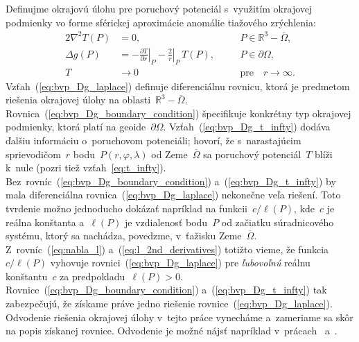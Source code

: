 \documentclass[a4paper,12pt]{book}
\begin{document}
Definujme okrajovú úlohu pre poruchový potenciál s~využitím okrajovej podmienky 
vo forme sférickej aproximácie anomálie tiažového zrýchlenia:
%
\begin{alignat}{2}
\nabla^2 T(P) &= 0{,} &&P \in \mathbb{R}^3 
- \overline\Omega{,}\label{eq:bvp_Dg_laplace}\\
\Delta g(P) &= -\left.\frac{\partial T}{\partial r}\right|_P 
- \left.\frac{2}{r}\right|_P \, T(P){,} \quad &&P \in 
\partial\Omega{,}\label{eq:bvp_Dg_boundary_condition}\\
T &\rightarrow 0 &&\textrm{pre} \quad r \rightarrow 
\infty{.}\label{eq:bvp_Dg_t_infty}
\end{alignat}
%
Vzťah~(\ref{eq:bvp_Dg_laplace}) definuje diferenciálnu rovnicu, ktorá je 
predmetom riešenia okrajovej úlohy na oblasti~$\mathbb{R}^3 - \overline\Omega$.  
Rovnica~(\ref{eq:bvp_Dg_boundary_condition}) špecifikuje konkrétny typ 
okrajovej podmienky, ktorá platí na geoide~$\partial\Omega$.  
Vzťah~(\ref{eq:bvp_Dg_t_infty}) dodáva ďalšiu informáciu o~poruchovom 
potenciáli; hovorí, že s~narastajúcim sprievodičom~$r$ bodu~$P(r, \varphi, 
\lambda)$ od Zeme~$\overline\Omega$ sa poruchový potenciál~$T$ blíži k~nule 
(pozri tiež vzťah~\ref{eq:t_infty}).  
Bez~rovníc~(\ref{eq:bvp_Dg_boundary_condition}) a~(\ref{eq:bvp_Dg_t_infty}) by 
mala diferenciálna rovnica~(\ref{eq:bvp_Dg_laplace}) nekonečne veľa riešení.  
Toto tvrdenie možno jednoducho dokázať napríklad na funkcii~$c \slash \ell(P)$, 
kde~$c$ je reálna konštanta a~$\ell(P)$ je vzdialenosť bodu~$P$ od začiatku 
súradnicového systému, ktorý sa nachádza, povedzme, v~ťažisku 
Zeme~$\overline\Omega$.  Z~rovníc~(\ref{eq:nabla_l}) 
a~(\ref{eq:l_2nd_derivatives}) totižto vieme, že funkcia~$c \slash \ell(P)$ 
vyhovuje rovnici~(\ref{eq:bvp_Dg_laplace}) pre \emph{ľubovoľnú} reálnu 
konštantu~$c$ za predpokladu~$\ell(P) > 0$.  
Rovnice~(\ref{eq:bvp_Dg_boundary_condition}) a~(\ref{eq:bvp_Dg_t_infty}) tak 
zabezpečujú, že získame práve jedno riešenie rovnice~(\ref{eq:bvp_Dg_laplace}).  
Odvodenie riešenia okrajovej úlohy v~tejto práce vynecháme a~zameriame sa skôr 
na popis získanej rovnice.  Odvodenie je možné nájsť napríklad 
v~prácach~\textcite{MoritzPhysicalGeodesy} a~\textcite{Janak2006}.
\end{document}
